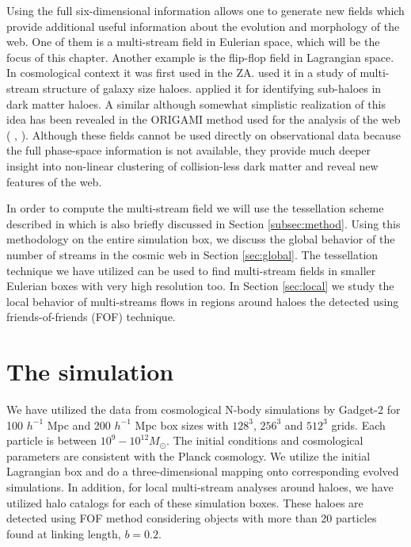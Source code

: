 Using the full six-dimensional information allows one to generate new fields which  provide 
additional useful information about the evolution and morphology of the  web. 
One of them is a multi-stream field in Eulerian space, which will be the focus of this chapter. 
Another example is the flip-flop field in Lagrangian space. In cosmological context it was first used in the ZA.
\citet{Vogelsberger2011} used it in a study of multi-stream structure of galaxy size haloes.
\citet{Shandarin2014a} applied it for identifying sub-haloes  in dark matter haloes.
A similar although somewhat simplistic realization of this idea has been revealed in the ORIGAMI method
used for the analysis of the web ( \citealt{Falck2012},  \citealt{Falck2015} ).
 Although these fields cannot be used directly on observational data because the full phase-space information
 is not available, they provide much deeper insight into non-linear clustering of collision-less dark matter
and reveal new features of the web.


In order to compute the multi-stream field we will use the tessellation scheme described in
 \citet{Shandarin2012} which is  also briefly discussed in Section \ref{subsec:method}.
  Using this methodology on the entire simulation box, we discuss the global behavior of the number of streams in the cosmic web in Section \ref{sec:global}. 
  The tessellation technique we have utilized can be used to find multi-stream fields in smaller Eulerian boxes with very high resolution too. In Section \ref{sec:local} we study the local behavior of multi-streams flows in regions around haloes the detected using friends-of-friends (FOF) technique.
 
 


\section{The simulation}
\label{sec:3simulation}


We have utilized the data from cosmological N-body simulations by Gadget-2 \citep{Springel2005c} for 100 $h^{-1}$ Mpc  and 200 $h^{-1}$ Mpc box 
sizes with $128^3$, $256^3$ and $512^3$ grids. Each particle is between  $10^9 - 10^{12} M_{\odot}$. 
The initial conditions and cosmological parameters are consistent with the Planck cosmology. We utilize the initial Lagrangian box and do a three-dimensional mapping onto corresponding evolved simulations. In addition, for local multi-stream analyses around haloes, we have utilized halo catalogs for each of these simulation boxes. These haloes are detected using FOF method considering objects with more than 20 particles found at linking length, $ b= 0.2$.  
